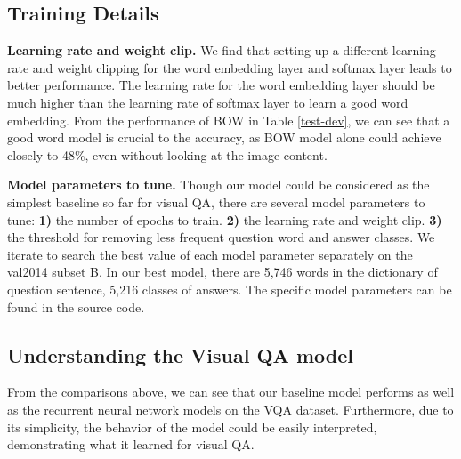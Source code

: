\documentclass{article} %
\begin{document}
\subsection{Training Details}
\textbf{Learning rate and weight clip.} We find that setting up a different learning rate and weight clipping for the word embedding layer and softmax layer leads to better performance. The learning rate for the word embedding layer should be much higher than the learning rate of softmax layer to learn a good word embedding. From the performance of BOW in Table \ref{test-dev}, we can see that a good word model is crucial to the accuracy, as BOW model alone could achieve closely to 48\%, even without looking at the image content. 

\textbf{Model parameters to tune.} Though our model could be considered as the simplest baseline so far for visual QA, there are several model parameters to tune: \textbf{1)} the number of epochs to train. \textbf{2)} the learning rate and weight clip. \textbf{3)} the threshold for removing less frequent question word and answer classes. We iterate to search the best value of each model parameter separately on the val2014 subset B. In our best model, there are 5,746 words in the dictionary of question sentence, 5,216 classes of answers. The specific model parameters can be found in the source code.


\subsection{Understanding the Visual QA model}

From the comparisons above, we can see that our baseline model performs as well as the recurrent neural network models on the VQA dataset. Furthermore, due to its simplicity, the behavior of the model could be easily interpreted, demonstrating what it learned for visual QA. 
\end{document}

